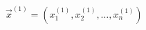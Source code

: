 \documentclass[A4,11pt]{article}
\begin{document}
\thispagestyle{empty}
$\vec{x}^{(1)}=\left(x_1^{(1)}, x_2^{(1)}, \dots, x_n^{(1)}\right)$
\end{document}
